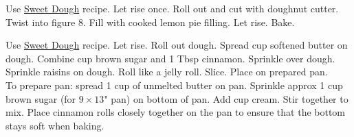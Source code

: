 \begin{minipage}{\linewidth}
\end{minipage}\par\begin{minipage}{\linewidth} 
Use \hyperlink{sweetdoughlink}{Sweet Dough} recipe. Let rise once. Roll out and cut with doughnut cutter. Twist into figure 8. Fill with cooked lemon pie filling. Let rise. Bake.

\end{minipage}\par\begin{minipage}{\linewidth} 
Use \hyperlink{sweetdoughlink}{Sweet Dough} recipe. Let rise. Roll out dough. Spread  cup softened butter on dough. Combine  cup brown sugar and 1 Tbsp cinnamon. Sprinkle over dough. Sprinkle raisins on dough. Roll like a jelly roll. Slice. Place on prepared pan.\\
To prepare pan: spread 1 cup of unmelted butter on pan. Sprinkle approx 1 cup brown sugar (for $9 \times 13$" pan) on bottom of pan. Add  cup cream. Stir together to mix.
Place cinnamon rolls closely together on the pan to ensure that the bottom stays soft when baking.


\end{minipage}

